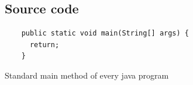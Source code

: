 \subsection{Source code}
\begin{listing}
  \begin{verbatim}
    public static void main(String[] args) {
      return;
    }
  \end{verbatim}
  \caption{Standard main method of every java program}~\label{lst:javamain}
\end{listing}

\lipsum[9-14]
\lipsum[2]~\cite{book:handbook}
